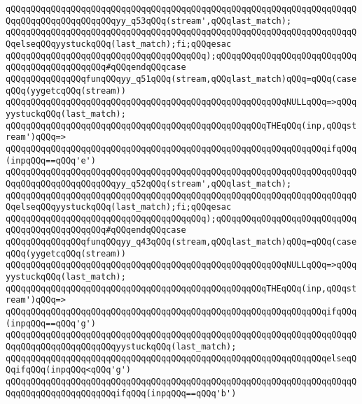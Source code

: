 \verb|qQQqqQQqqQQqqQQqqQQqqQQqqQQqqQQqqQQqqQQqqQQqqQQqqQQqqQQqqQQqqQQqqQQqqQQqqQQqqQQqqQQqqQQqqQQqyy_q53qQQq(stream',qQQqlast_match);|\newline
\verb|qQQqqQQqqQQqqQQqqQQqqQQqqQQqqQQqqQQqqQQqqQQqqQQqqQQqqQQqqQQqqQQqqQQqqQQqelseqQQqyystuckqQQq(last_match);fi;qQQqesac|\newline
\verb|qQQqqQQqqQQqqQQqqQQqqQQqqQQqqQQqqQQqqQQq);qQQqqQQqqQQqqQQqqQQqqQQqqQQqqQQqqQQqqQQqqQQqqQQq#qQQqendqQQqcase|\newline
\verb|qQQqqQQqqQQqqQQqfunqQQqyy_q51qQQq(stream,qQQqlast_match)qQQq=qQQq(caseqQQq(yygetcqQQq(stream))|\newline
\verb|qQQqqQQqqQQqqQQqqQQqqQQqqQQqqQQqqQQqqQQqqQQqqQQqqQQqqQQqNULLqQQq=>qQQqyystuckqQQq(last_match);|\newline
\verb|qQQqqQQqqQQqqQQqqQQqqQQqqQQqqQQqqQQqqQQqqQQqqQQqqQQqTHEqQQq(inp,qQQqstream')qQQq=>|\newline
\verb|qQQqqQQqqQQqqQQqqQQqqQQqqQQqqQQqqQQqqQQqqQQqqQQqqQQqqQQqqQQqqQQqifqQQq(inpqQQq==qQQq'e')|\newline
\verb|qQQqqQQqqQQqqQQqqQQqqQQqqQQqqQQqqQQqqQQqqQQqqQQqqQQqqQQqqQQqqQQqqQQqqQQqqQQqqQQqqQQqqQQqqQQqyy_q52qQQq(stream',qQQqlast_match);|\newline
\verb|qQQqqQQqqQQqqQQqqQQqqQQqqQQqqQQqqQQqqQQqqQQqqQQqqQQqqQQqqQQqqQQqqQQqqQQqelseqQQqyystuckqQQq(last_match);fi;qQQqesac|\newline
\verb|qQQqqQQqqQQqqQQqqQQqqQQqqQQqqQQqqQQqqQQq);qQQqqQQqqQQqqQQqqQQqqQQqqQQqqQQqqQQqqQQqqQQqqQQq#qQQqendqQQqcase|\newline
\verb|qQQqqQQqqQQqqQQqfunqQQqyy_q43qQQq(stream,qQQqlast_match)qQQq=qQQq(caseqQQq(yygetcqQQq(stream))|\newline
\verb|qQQqqQQqqQQqqQQqqQQqqQQqqQQqqQQqqQQqqQQqqQQqqQQqqQQqqQQqNULLqQQq=>qQQqyystuckqQQq(last_match);|\newline
\verb|qQQqqQQqqQQqqQQqqQQqqQQqqQQqqQQqqQQqqQQqqQQqqQQqqQQqTHEqQQq(inp,qQQqstream')qQQq=>|\newline
\verb|qQQqqQQqqQQqqQQqqQQqqQQqqQQqqQQqqQQqqQQqqQQqqQQqqQQqqQQqqQQqqQQqifqQQq(inpqQQq==qQQq'g')|\newline
\verb|qQQqqQQqqQQqqQQqqQQqqQQqqQQqqQQqqQQqqQQqqQQqqQQqqQQqqQQqqQQqqQQqqQQqqQQqqQQqqQQqqQQqqQQqqQQqyystuckqQQq(last_match);|\newline
\verb|qQQqqQQqqQQqqQQqqQQqqQQqqQQqqQQqqQQqqQQqqQQqqQQqqQQqqQQqqQQqqQQqelseqQQqifqQQq(inpqQQq<qQQq'g')|\newline
\verb|qQQqqQQqqQQqqQQqqQQqqQQqqQQqqQQqqQQqqQQqqQQqqQQqqQQqqQQqqQQqqQQqqQQqqQQqqQQqqQQqqQQqqQQqqQQqifqQQq(inpqQQq==qQQq'b')|\newline
